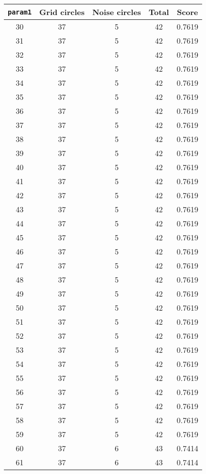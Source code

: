 \documentclass[letterpaper, 12pt]{article}
\begin{document}
\begin{longtable}{|c|c|c|c|c|}
\hline
\textbf{\texttt{param1}} & \textbf{Grid circles} & \textbf{Noise circles} & \textbf{Total} & \textbf{Score} \\
\hline
30 & 37 & 5 & 42 & 0.7619 \\
\hline
31 & 37 & 5 & 42 & 0.7619 \\
\hline
32 & 37 & 5 & 42 & 0.7619 \\
\hline
33 & 37 & 5 & 42 & 0.7619 \\
\hline
34 & 37 & 5 & 42 & 0.7619 \\
\hline
35 & 37 & 5 & 42 & 0.7619 \\
\hline
36 & 37 & 5 & 42 & 0.7619 \\
\hline
37 & 37 & 5 & 42 & 0.7619 \\
\hline
38 & 37 & 5 & 42 & 0.7619 \\
\hline
39 & 37 & 5 & 42 & 0.7619 \\
\hline
40 & 37 & 5 & 42 & 0.7619 \\
\hline
41 & 37 & 5 & 42 & 0.7619 \\
\hline
42 & 37 & 5 & 42 & 0.7619 \\
\hline
43 & 37 & 5 & 42 & 0.7619 \\
\hline
44 & 37 & 5 & 42 & 0.7619 \\
\hline
45 & 37 & 5 & 42 & 0.7619 \\
\hline
46 & 37 & 5 & 42 & 0.7619 \\
\hline
47 & 37 & 5 & 42 & 0.7619 \\
\hline
48 & 37 & 5 & 42 & 0.7619 \\
\hline
49 & 37 & 5 & 42 & 0.7619 \\
\hline
50 & 37 & 5 & 42 & 0.7619 \\
\hline
51 & 37 & 5 & 42 & 0.7619 \\
\hline
52 & 37 & 5 & 42 & 0.7619 \\
\hline
53 & 37 & 5 & 42 & 0.7619 \\
\hline
54 & 37 & 5 & 42 & 0.7619 \\
\hline
55 & 37 & 5 & 42 & 0.7619 \\
\hline
56 & 37 & 5 & 42 & 0.7619 \\
\hline
57 & 37 & 5 & 42 & 0.7619 \\
\hline
58 & 37 & 5 & 42 & 0.7619 \\
\hline
59 & 37 & 5 & 42 & 0.7619 \\
\hline
60 & 37 & 6 & 43 & 0.7414 \\
\hline
61 & 37 & 6 & 43 & 0.7414 \\

\end{longtable}
\end{document}
